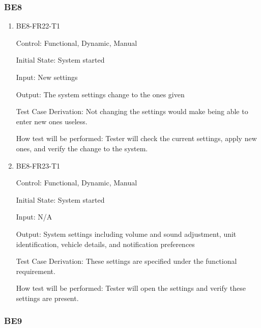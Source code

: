 \documentclass[12pt, titlepage]{article}
\begin{document}
\subsubsection{BE8}

\begin{enumerate}
    
    \item{BE8-FR22-T1}

    Control: Functional, Dynamic, Manual
    					
    Initial State: System started
    					
    Input: New settings
    					
    Output: The system settings change to the ones given
    
    Test Case Derivation: Not changing the settings would make being able to
    enter new ones useless.
    					
    How test will be performed: Tester will check the current settings, apply
    new ones, and verify the change to the system.

    \item{BE8-FR23-T1}

    Control: Functional, Dynamic, Manual
    					
    Initial State: System started
    					
    Input: N/A
    					
    Output: System settings including volume and sound adjustment, unit
    identification, vehicle details, and notification preferences
    
    Test Case Derivation: These settings are specified under the functional
    requirement.
    					
    How test will be performed: Tester will open the settings and verify these
    settings are present.
\end{enumerate}

\subsubsection{BE9}
\end{document}
